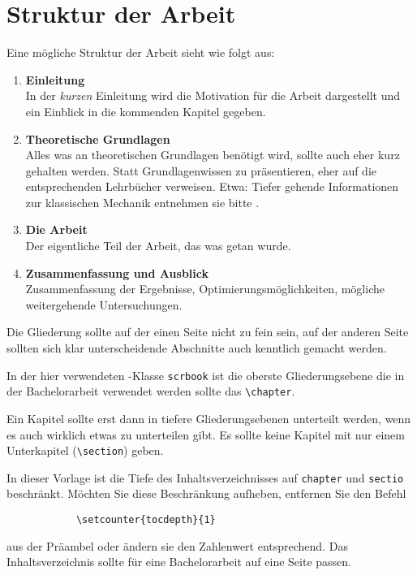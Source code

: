 \chapter{Struktur der Arbeit}

Eine mögliche Struktur der Arbeit sieht wie folgt aus:

\begin{enumerate}
    \item \textbf{Einleitung}\\
        In der \emph{kurzen} Einleitung wird die Motivation für die Arbeit
        dargestellt und ein Einblick in die kommenden Kapitel gegeben.
    \item \textbf{Theoretische Grundlagen}\\
        Alles was an theoretischen Grundlagen benötigt wird, sollte auch eher kurz gehalten werden.
        Statt Grundlagenwissen zu präsentieren, eher auf die entsprechenden Lehrbücher verweisen.
        Etwa: Tiefer gehende Informationen zur klassischen Mechanik entnehmen sie bitte \cite{kuypers}.
    \item \textbf{Die Arbeit} \\
        Der eigentliche Teil der Arbeit, das was getan wurde.
    \item \textbf{Zusammenfassung und Ausblick} \\
        Zusammenfassung der Ergebnisse, Optimierungsmöglichkeiten, mögliche weitergehende Untersuchungen.
\end{enumerate}

Die Gliederung sollte auf der einen Seite nicht zu fein sein, auf der anderen Seite
sollten sich klar unterscheidende Abschnitte auch kenntlich gemacht werden.

In der hier verwendeten \KOMAScript-Klasse \texttt{scrbook} ist die oberste Gliederungsebene
die in der Bachelorarbeit verwendet werden sollte das \texttt{\textbackslash chapter}.

Ein Kapitel sollte erst dann in tiefere Gliederungsebenen unterteilt werden, wenn es auch wirklich etwas zu unterteilen gibt. Es sollte keine Kapitel mit nur einem Unterkapitel (\texttt{\textbackslash section}) geben.

In dieser Vorlage ist die Tiefe des Inhaltsverzeichnisses auf \texttt{chapter} und \texttt{sectio} beschränkt. Möchten Sie diese Beschränkung aufheben, entfernen Sie den Befehl
\begin{verbatim}
            \setcounter{tocdepth}{1}
\end{verbatim}
aus der Präambel oder ändern sie den Zahlenwert entsprechend. Das Inhaltsverzeichnis sollte für eine Bachelorarbeit auf eine Seite passen.
